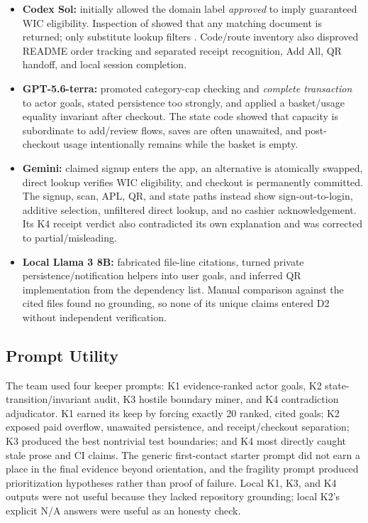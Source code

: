 \documentclass[sigconf]{acmart}
\begin{document}
\begin{itemize}
  \item \textbf{Codex Sol:} initially allowed the domain label
  \emph{approved} to imply guaranteed WIC eligibility. Inspection of
   showed that any matching document is returned;
  only substitute lookup filters . Code/route inventory also
  disproved README order tracking and separated receipt recognition, Add All,
  QR handoff, and local session completion.
  \item \textbf{GPT-5.6-terra:} promoted category-cap checking and
  \emph{complete transaction} to actor goals, stated persistence too strongly,
  and applied a basket/usage equality invariant after checkout. The state code
  showed that capacity is subordinate to add/review flows, saves are often
  unawaited, and post-checkout usage intentionally remains while the basket is
  empty.
  \item \textbf{Gemini:} claimed signup enters the app, an alternative is
  atomically swapped, direct lookup verifies WIC eligibility, and checkout is
  permanently committed. The signup, scan, APL, QR, and state paths instead
  show sign-out-to-login, additive selection, unfiltered direct lookup, and no
  cashier acknowledgement. Its K4 receipt verdict also contradicted its own
  explanation and was corrected to partial/misleading.
  \item \textbf{Local Llama 3 8B:} fabricated file-line citations, turned
  private persistence/notification helpers into user goals, and inferred QR
  implementation from the dependency list. Manual comparison against the
  cited files found no grounding, so none of its unique claims entered D2
  without independent verification.
\end{itemize}

\subsection{Prompt Utility}

The team used four keeper prompts: K1
evidence-ranked actor goals, K2 state-transition/invariant audit, K3 hostile
boundary miner, and K4 contradiction adjudicator. K1 earned its keep by
forcing exactly 20 ranked, cited goals; K2 exposed paid overflow, unawaited
persistence, and receipt/checkout separation; K3 produced the best nontrivial
test boundaries; and K4 most directly caught stale prose and CI claims. The
generic first-contact starter prompt did not earn a place in the final evidence
beyond orientation, and the fragility prompt produced prioritization
hypotheses rather than proof of failure. Local K1, K3, and K4 outputs were not
useful because they lacked repository grounding; local K2's explicit N/A
answers were useful as an honesty check.
\end{document}
